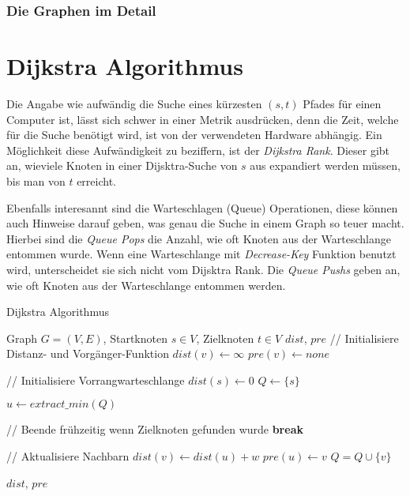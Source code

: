 \subsubsection{Die Graphen im Detail}


\section{Dijkstra Algorithmus}

Die Angabe wie aufwändig die Suche eines kürzesten $(s, t)$ Pfades für einen Computer ist, lässt sich schwer in einer Metrik ausdrücken, denn die Zeit, welche für die Suche benötigt wird, ist von der verwendeten Hardware abhängig.
Ein Möglichkeit diese Aufwändigkeit zu beziffern, ist der \emph{Dijkstra Rank}.
Dieser gibt an, wieviele Knoten in einer Dijsktra-Suche von $s$ aus expandiert werden müssen, bis man von $t$ erreicht.


Ebenfalls interesannt sind die Warteschlagen (Queue) Operationen, diese können auch Hinweise darauf geben, was genau die Suche in einem Graph so teuer macht.
Hierbei sind die \emph{Queue Pops} die Anzahl, wie oft Knoten aus der Warteschlange entommen wurde.
Wenn eine Warteschlange mit \emph{Decrease-Key} Funktion benutzt wird, unterscheidet sie sich nicht vom Dijsktra Rank.
Die \emph{Queue Pushs} geben an, wie oft Knoten aus der Warteschlange entommen werden.


\begin{algorithm}[ht]
    \caption{Dijkstra Algorithmus}
    \begin{algorithmic}[1]
        \Require Graph $G = (V, E)$, Startknoten $s \in V$, Zielknoten $t \in V$
        \Ensure ${dist}$, ${pre}$
        \State // Initialisiere Distanz- und Vorgänger-Funktion
        \State ${dist}(v) \leftarrow \infty$
        \State ${pre}(v) \leftarrow {none}$
        \EndFor


        \State
        \State // Initialisiere Vorrangwarteschlange
        \State ${dist}(s) \leftarrow 0$
        \State $Q\leftarrow \{ s \}$

        \State
        \State $u \leftarrow{extract\_min}(Q)$\label{graphs:dijkstra:pop}

        \State
        \State // Beende frühzeitig wenn Zielknoten gefunden wurde
        \State \textbf{break}
        \EndIf

        \State
        \State // Aktualisiere Nachbarn
        \State ${dist}(v) \leftarrow {dist}(u) + w$
        \State ${pre}(u) \leftarrow v$
        \State $Q = Q \cup \{ v \}$
        \EndIf
        \EndFor

        \EndWhile

        \State
        \State \Return ${dist}$, ${pre}$
    \end{algorithmic}
\end{algorithm}


